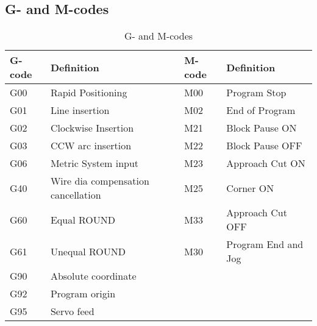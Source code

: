 \section*{}
 \appendix
 \subsection{G- and M-codes}
 \begin{table}[!h]
 	\caption[G- and M-Codes]{G- and M-codes}

 \begin{center}
 \centering
 \begin{tabular}{|l|l|l|l|}
 \hline
 \textbf{G-code} & \textbf{Definition} &\textbf{ M-code} & \textbf{Definition}\\
 \hline
 
 G00 & Rapid Positioning & M00 & Program Stop\\
 G01 & Line insertion &  M02 & End of Program \\
 G02 & Clockwise Insertion & M21 & Block Pause ON \\
 G03 & CCW arc insertion& M22 & Block Pause OFF \\
 G06 & Metric System input & M23 & Approach Cut ON\\
 G40 & Wire dia compensation cancellation & M25 & Corner ON \\
 G60 & Equal ROUND& M33 & Approach Cut OFF\\
 G61 & Unequal ROUND &  M30 & Program End and Jog\\
 G90 & Absolute coordinate&&\\
 G92 & Program origin &&\\
 G95 & Servo feed&&\\
 \hline
 \end{tabular}
 \end{center}
 \end{table}
